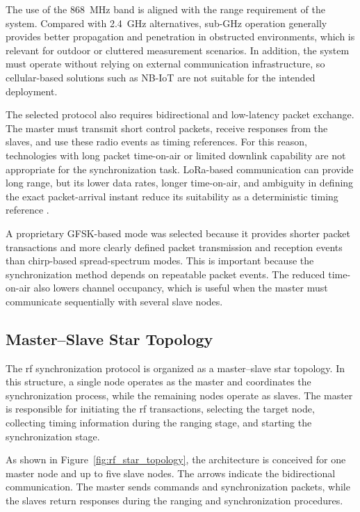 The use of the 868~MHz band is aligned with the range requirement of the system. Compared with 2.4~GHz alternatives, sub-GHz operation generally provides better propagation and penetration in obstructed environments, which is relevant for outdoor or cluttered measurement scenarios. In addition, the system must operate without relying on external communication infrastructure, so cellular-based solutions such as NB-IoT are not suitable for the intended deployment.

The selected protocol also requires bidirectional and low-latency packet exchange. The master must transmit short control packets, receive responses from the slaves, and use these radio events as timing references. For this reason, technologies with long packet time-on-air or limited downlink capability are not appropriate for the synchronization task. LoRa-based communication can provide long range, but its lower data rates, longer time-on-air, and ambiguity in defining the exact packet-arrival instant reduce its suitability as a deterministic timing reference \cite{raza2017rf, prando2019rf}.

A proprietary GFSK-based mode was selected because it provides shorter packet transactions and more clearly defined packet transmission and reception events than chirp-based spread-spectrum modes. This is important because the synchronization method depends on repeatable packet events. The reduced time-on-air also lowers channel occupancy, which is useful when the master must communicate sequentially with several slave nodes.

\subsection{Master--Slave Star Topology}

The \acrshort{rf} synchronization protocol is organized as a master--slave star topology. In this structure, a single node operates as the master and coordinates the synchronization process, while the remaining nodes operate as slaves. The master is responsible for initiating the \acrshort{rf} transactions, selecting the target node, collecting timing information during the ranging stage, and starting the synchronization stage. 

As shown in Figure~\ref{fig:rf_star_topology}, the architecture is conceived for one master node and up to five slave nodes. The arrows indicate the bidirectional communication. The master sends commands and synchronization packets, while the slaves return responses during the ranging and synchronization procedures. 

